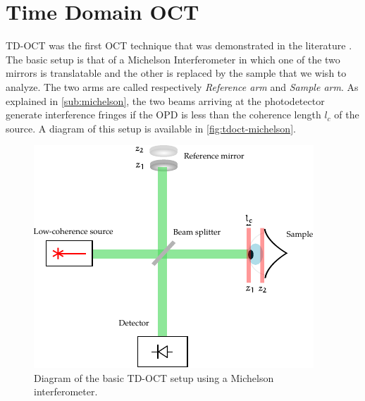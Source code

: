 


\section{Time Domain OCT}
 \acf{TD-OCT} was the first OCT technique that was demonstrated in the literature \cite{Huang1991}. The basic setup is that of a Michelson Interferometer in which one of the two mirrors is translatable and the other is replaced by the sample that we wish to analyze. The two arms are called respectively \emph{Reference arm} and \emph{Sample arm}. As explained in \autoref{sub:michelson}, the two beams arriving at the photodetector generate interference fringes if the \ac{OPD} is less than the coherence length $l_c$ of the source. A diagram of this setup is available in \autoref{fig:tdoct-michelson}. 
 
 
 \begin{figure}[hbt]
 	\myfloatalign
 	\includegraphics[width=0.8\linewidth]{gfx/tdoct}
 	\caption{Diagram of the basic \ac{TD-OCT} setup using a Michelson interferometer.}\label{fig:tdoct-michelson}
 \end{figure}
 
